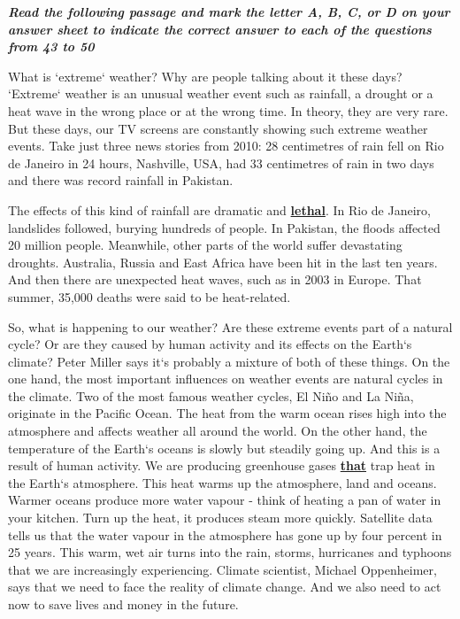 \documentclass[11pt]{article}
\begin{document}
\begin{multiplechoice}[rearrange=yes, keycolumns=2]%
\examvspace*{0.7cm}
\textit{\textbf{Read the following passage and mark the letter A, B, C, or D on your answer sheet to indicate the
correct answer to each of the questions from 43 to 50 }}

What is `extreme‘ weather? Why are people talking about it these days? `Extreme‘ weather is an unusual
weather event such as rainfall, a drought or a heat wave in the wrong place or at the wrong time. In theory,
they are very rare. But these days, our TV screens are constantly showing such extreme weather events. Take
just three news stories from 2010: 28 centimetres of rain fell on Rio de Janeiro in 24 hours, Nashville, USA, had
33 centimetres of rain in two days and there was record rainfall in Pakistan.

The effects of this kind of rainfall are dramatic and \textbf{\underline{lethal}}. In Rio de Janeiro, landslides followed, burying
hundreds of people. In Pakistan, the floods affected 20 million people. Meanwhile, other parts of the world suffer
devastating droughts. Australia, Russia and East Africa have been hit in the last ten years. And then there are
unexpected heat waves, such as in 2003 in Europe. That summer, 35,000 deaths were said to be heat-related.

So, what is happening to our weather? Are these extreme events part of a natural cycle? Or are they caused by
human activity and its effects on the Earth‘s climate? Peter Miller says it‘s probably a mixture of both of these
things. On the one hand, the most important influences on weather events are natural cycles in the climate. Two
of the most famous weather cycles, El Niño and La Niña, originate in the Pacific Ocean. The heat from the warm
ocean rises high into the atmosphere and affects weather all around the world. On the other hand, the
temperature of the Earth‘s oceans is slowly but steadily going up. And this is a result of human activity. We are
producing greenhouse gases \underline{\textbf{that}} trap heat in the Earth‘s atmosphere. This heat warms up the atmosphere, land
and oceans. Warmer oceans produce more water vapour - think of heating a pan of water in your kitchen. Turn
up the heat, it produces steam more quickly. Satellite data tells us that the water vapour in the atmosphere has
gone up by four percent in 25 years. This warm, wet air turns into the rain, storms, hurricanes and typhoons that
we are increasingly experiencing. Climate scientist, Michael Oppenheimer, says that we need to face the reality of
climate change. And we also need to act now to save lives and money in the future.


\end{multiplechoice}
\end{document}
